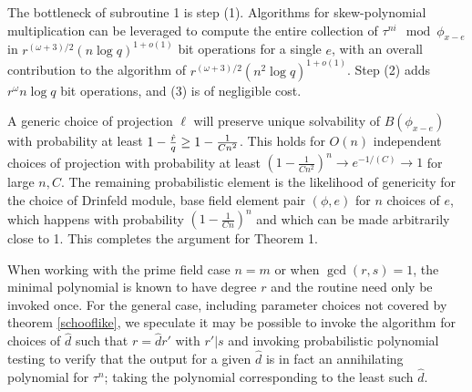 The bottleneck of subroutine 1 is step (1). Algorithms for skew-polynomial multiplication can be leveraged to compute the entire collection of $\tau^{ni} \mod \phi_{x - e}$ in $r^{(\omega+3)/2}(n \log q)^{1 + o(1)}$ bit operations for a single $e$, with an overall contribution to the algorithm of $r^{(\omega+3)/2}(n^2 \log q)^{1 + o(1)}$. Step (2) adds $r^{\omega}n\log q$ bit operations, and (3) is of negligible cost. 

A generic choice of projection $\ell$ will preserve unique solvability of $B(\phi_{x-e})$ with probability at least $1 - \frac{\hat{r}}{q} \geq 1 - \frac{1}{Cn^2} $. This holds for $O(n)$ independent choices of projection with probability at least $(1 - \frac{1}{Cn^2})^n \to e^{-1/(C)} \to 1$ for large $n, C$. The remaining probabilistic element is the likelihood of genericity for the choice of Drinfeld module, base field element pair $(\phi, e)$ for $n$ choices of $e$, which happens with probability $(1 - \frac{1}{Cn})^{n}$ and which can be made arbitrarily close to 1. This completes the argument for Theorem 1.

When working with the prime field case $n = m$ or when $\gcd(r, s) = 1$, the minimal polynomial is known to have degree $r$ and the routine need only be invoked once. For the general case, including parameter choices not covered by theorem \ref{schooflike}, we speculate it may be possible to invoke the algorithm for choices of $\hat{d}$ such that $r = \hat{d} r'$ with $r' | s$ and invoking probabilistic polynomial testing to verify that the output for a given $\hat{d}$ is in fact an annihilating polynomial for $\tau^n$; taking the polynomial corresponding to the least such $\hat{d}$.

    
